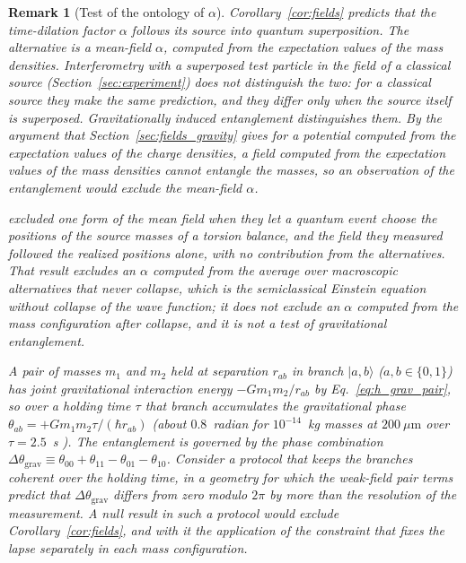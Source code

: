 \documentclass[aps,prd,onecolumn,tightenlines,nofootinbib,notitlepage,11pt,floatfix]{revtex4-2}
\theoremstyle{indentedtheorem}
\newtheorem{remark}{Remark}
\begin{document}
\begin{remark}[Test of the ontology of $\alpha$]\label{rem:lapse_test}
Corollary~\ref{cor:fields} predicts that the time-dilation factor $\alpha$ follows its source into quantum superposition. The alternative is a mean-field $\alpha$, computed from the expectation values of the mass densities. Interferometry with a superposed test particle in the field of a classical source (Section~\ref{sec:experiment}) does not distinguish the two: for a classical source they make the same prediction, and they differ only when the source itself is superposed. Gravitationally induced entanglement distinguishes them. By the argument that Section~\ref{sec:fields_gravity} gives for a potential computed from the expectation values of the charge densities, a field computed from the expectation values of the mass densities cannot entangle the masses, so an observation of the entanglement would exclude the mean-field $\alpha$.

\citet{PageGeilker1981Indirect} excluded one form of the mean field when they let a quantum event choose the positions of the source masses of a torsion balance, and the field they measured followed the realized positions alone, with no contribution from the alternatives. That result excludes an $\alpha$ computed from the average over macroscopic alternatives that never collapse, which is the semiclassical Einstein equation without collapse of the wave function; it does not exclude an $\alpha$ computed from the mass configuration after collapse, and it is not a test of gravitational entanglement.

A pair of masses $m_1$ and $m_2$ held at separation $r_{ab}$ in branch $|a,b\rangle$ ($a,b\in\{0,1\}$) has joint gravitational interaction energy $-G m_1 m_2 / r_{ab}$ by Eq.~\eqref{eq:h_grav_pair}, so over a holding time $\tau$ that branch accumulates the gravitational phase $\theta_{ab} = +G m_1 m_2 \tau / (\hbar r_{ab})$ (about $0.8$~radian for $10^{-14}$~kg masses at $200~\mu\text{m}$ over $\tau=2.5$~s \citep{Bose2017Spin}). The entanglement is governed by the phase combination $\Delta\theta_\text{grav}\equiv\theta_{00}+\theta_{11}-\theta_{01}-\theta_{10}$. Consider a protocol that keeps the branches coherent over the holding time, in a geometry for which the weak-field pair terms predict that $\Delta\theta_\text{grav}$ differs from zero modulo $2\pi$ by more than the resolution of the measurement. A null result in such a protocol would exclude Corollary~\ref{cor:fields}, and with it the application of the constraint that fixes the lapse separately in each mass configuration.


\end{remark}
\end{document}
